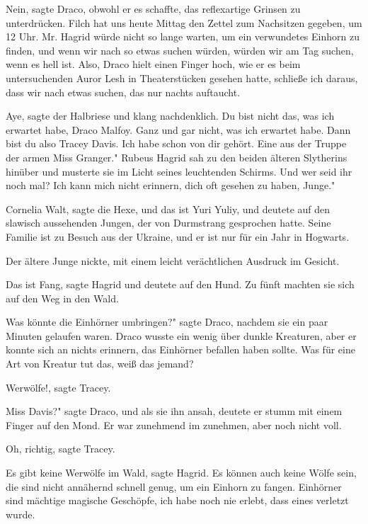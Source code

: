 \glqq Nein\grqq{}, sagte Draco, obwohl er es schaffte, das reflexartige Grinsen
zu unterdrücken. \glqq Filch hat uns heute Mittag den Zettel zum
Nachsitzen gegeben, um 12 Uhr. Mr. Hagrid würde nicht so lange warten, um
ein verwundetes Einhorn zu finden, und wenn wir nach so etwas suchen
würden, würden wir am Tag suchen, wenn es hell ist. Also\grqq{}, Draco
hielt einen Finger hoch, wie er es beim untersuchenden Auror Lesh in
Theaterstücken gesehen hatte, \glqq schließe ich daraus, dass wir nach
etwas suchen, das nur nachts auftaucht.\grqq{}

\glqq Aye\grqq{}, sagte der Halbriese und klang nachdenklich. \glqq Du bist
nicht das, was ich erwartet habe, Draco Malfoy. Ganz und gar nicht, was
ich erwartet habe. Dann bist du also Tracey Davis. Ich habe schon von dir
gehört. Eine aus der Truppe der armen Miss Granger." Rubeus Hagrid sah zu
den beiden älteren Slytherins hinüber und musterte sie im Licht seines
leuchtenden Schirms. \glqq Und wer seid ihr noch mal? Ich kann mich nicht
erinnern, dich oft gesehen zu haben, Junge."

\glqq Cornelia Walt\grqq{}, sagte die Hexe, \glqq und das ist Yuri Yuliy\grqq{},
und deutete auf den slawisch aussehenden Jungen, der von Durmstrang
gesprochen hatte. \glqq Seine Familie ist zu Besuch aus der Ukraine, und
er ist nur für ein Jahr in Hogwarts.\grqq{}

Der ältere Junge nickte, mit einem leicht verächtlichen Ausdruck im Gesicht.

\glqq Das ist Fang\grqq{}, sagte Hagrid und deutete auf den Hund. Zu fünft
machten sie sich auf den Weg in den Wald.

\glqq Was könnte die Einhörner umbringen?" sagte Draco, nachdem sie ein paar
Minuten gelaufen waren. Draco wusste ein wenig über dunkle Kreaturen,
aber er konnte sich an nichts erinnern, das Einhörner befallen haben
sollte. \glqq Was für eine Art von Kreatur tut das, weiß das
jemand?\grqq{}

\glqq Werwölfe!\grqq{}, sagte Tracey.

\glqq Miss Davis?" sagte Draco, und als sie ihn ansah, deutete er stumm mit
einem Finger auf den Mond. Er war zunehmend im zunehmen, aber noch nicht
voll.

\glqq Oh, richtig\grqq{}, sagte Tracey.

\glqq Es gibt keine Werwölfe im Wald\grqq{}, sagte Hagrid. \glqq Es können auch
keine Wölfe sein, die sind nicht annähernd schnell genug, um ein Einhorn
zu fangen. Einhörner sind mächtige magische Geschöpfe, ich habe noch nie
erlebt, dass eines verletzt wurde.\grqq{}

